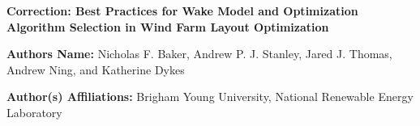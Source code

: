 \documentclass[18pt]{report}
\begin{document}
\fontsize{18pt}{0}\selectfont
\noindent\textbf{Correction: Best Practices for Wake Model and Optimization Algorithm
Selection in Wind Farm Layout Optimization}

\vspace{0.24in}%

\fontsize{10pt}{0}\selectfont
\noindent\textbf{Authors Name:} Nicholas F. Baker, Andrew P. J. Stanley, Jared J. Thomas, Andrew Ning, and Katherine Dykes

\noindent\textbf{Author(s) Affiliations:} Brigham Young University, National Renewable Energy Laboratory
\end{document}
